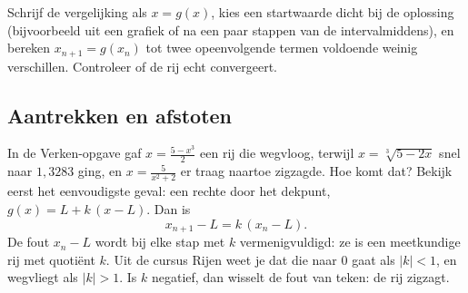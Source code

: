\begin{werkwijze}
Schrijf de vergelijking als $x = g(x)$, kies een startwaarde dicht bij de oplossing (bijvoorbeeld uit een grafiek of na een paar stappen van de intervalmiddens), en bereken $x_{n+1} = g(x_n)$ tot twee opeenvolgende termen voldoende weinig verschillen. Controleer of de rij echt convergeert.
\end{werkwijze}


\begin{oefeningen}
\end{oefeningen}

\subsection{Aantrekken en afstoten}

In de Verken-opgave gaf $x = \frac{5 - x^3}{2}$ een rij die wegvloog, terwijl $x = \sqrt[3]{5 - 2x}$ snel naar $1{,}3283$ ging, en $x = \frac{5}{x^2 + 2}$ er traag naartoe zigzagde. Hoe komt dat? Bekijk eerst het eenvoudigste geval: een rechte door het dekpunt, $g(x) = L + k\,(x - L)$. Dan is
\[
x_{n+1} - L = k\,(x_n - L) .
\]
De fout $x_n - L$ wordt bij elke stap met $k$ vermenigvuldigd: ze is een meetkundige rij met quotiënt $k$. Uit de cursus Rijen weet je dat die naar 0 gaat als $|k| < 1$, en wegvliegt als $|k| > 1$. Is $k$ negatief, dan wisselt de fout van teken: de rij zigzagt.

